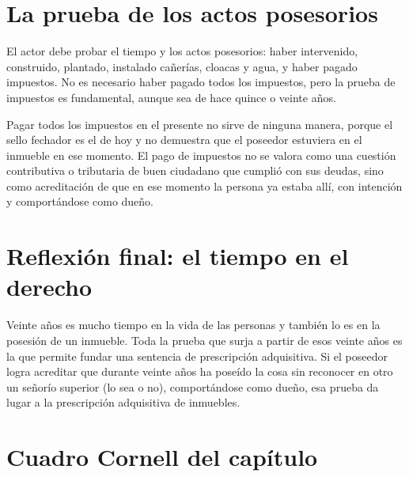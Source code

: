 \documentclass[12pt,oneside]{book}
\begin{document}
\section{La prueba de los actos posesorios}

El actor debe probar el tiempo y los actos posesorios: haber intervenido, construido, plantado, instalado cañerías, cloacas y agua, y haber pagado impuestos. No es necesario haber pagado todos los impuestos, pero la prueba de impuestos es fundamental, aunque sea de hace quince o veinte años.

\begin{important}
Pagar todos los impuestos en el presente no sirve de ninguna manera, porque el sello fechador es el de hoy y no demuestra que el poseedor estuviera en el inmueble en ese momento. El pago de impuestos no se valora como una cuestión contributiva o tributaria de buen ciudadano que cumplió con sus deudas, sino como acreditación de que en ese momento la persona ya estaba allí, con intención y comportándose como dueño.
\end{important}

\section{Reflexión final: el tiempo en el derecho}

Veinte años es mucho tiempo en la vida de las personas y también lo es en la posesión de un inmueble. Toda la prueba que surja a partir de esos veinte años es la que permite fundar una sentencia de prescripción adquisitiva. Si el poseedor logra acreditar que durante veinte años ha poseído la cosa sin reconocer en otro un señorío superior (lo sea o no), comportándose como dueño, esa prueba da lugar a la prescripción adquisitiva de inmuebles.

\section{Cuadro Cornell del capítulo}
\end{document}

